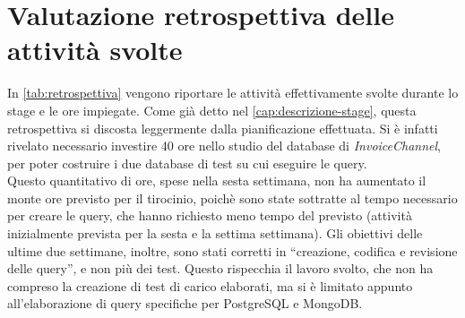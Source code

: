\section{Valutazione retrospettiva delle attività svolte}
In \autoref{tab:retrospettiva} vengono riportare le attività effettivamente svolte durante lo stage e le ore impiegate. Come già detto nel \autoref{cap:descrizione-stage}, questa retrospettiva si discosta leggermente dalla pianificazione effettuata. Si è infatti rivelato necessario investire 40 ore nello studio del database di \textit{InvoiceChannel}, per poter costruire i due database di test su cui eseguire le query.\\
Questo quantitativo di ore, spese nella sesta settimana, non ha aumentato il monte ore previsto per il tirocinio, poichè sono state sottratte al tempo necessario per creare le query, che hanno richiesto meno tempo del previsto (attività inizialmente prevista per la sesta e la settima settimana).
Gli obiettivi delle ultime due settimane, inoltre, sono stati corretti in ``creazione, codifica e revisione delle query'', e non più dei test. Questo rispecchia il lavoro svolto, che non ha compreso la creazione di test di carico elaborati, ma si è limitato appunto all'elaborazione di query specifiche per PostgreSQL e MongoDB.


